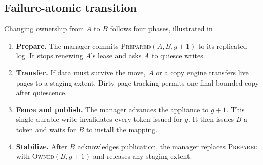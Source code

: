 \subsection{Failure-atomic transition}
\label{sec:transition}

Changing ownership from $A$ to $B$ follows four phases, illustrated in
.

\begin{enumerate}[leftmargin=1.45em]
  \item \textbf{Prepare.} The manager commits
  \textsc{Prepared}$(A,B,g{+}1)$ to its replicated log. It stops renewing
  $A$'s lease and asks $A$ to quiesce writes.
  \item \textbf{Transfer.} If data must survive the move, $A$ or a copy engine
  transfers live pages to a staging extent. Dirty-page tracking permits one
  final bounded copy after quiescence.
  \item \textbf{Fence and publish.} The manager advances the appliance to
  $g{+}1$. This single durable write invalidates every token issued for $g$.
  It then issues $B$ a token and waits for $B$ to install the mapping.
  \item \textbf{Stabilize.} After $B$ acknowledges publication, the manager
  replaces \textsc{Prepared} with \textsc{Owned}$(B,g{+}1)$ and releases any
  staging extent.
\end{enumerate}

